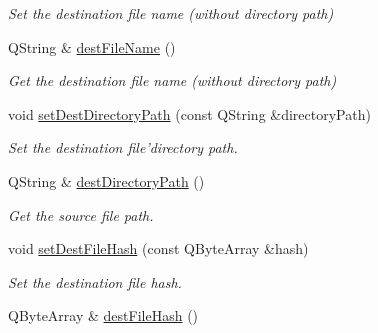 \begin{DoxyCompactItemize}
\begin{DoxyCompactList}\small\item\em Set the destination file name (without directory path) \end{DoxyCompactList}\item 
\hypertarget{classmdt_file_copier_item_af23cdc4c19fb8b80b7781c9dbe3bdc21}{
QString \& \hyperlink{classmdt_file_copier_item_af23cdc4c19fb8b80b7781c9dbe3bdc21}{destFileName} ()}
\label{classmdt_file_copier_item_af23cdc4c19fb8b80b7781c9dbe3bdc21}

\begin{DoxyCompactList}\small\item\em Get the destination file name (without directory path) \end{DoxyCompactList}\item 
\hypertarget{classmdt_file_copier_item_a64b6cb199454a76f1ceac9a658f62f83}{
void \hyperlink{classmdt_file_copier_item_a64b6cb199454a76f1ceac9a658f62f83}{setDestDirectoryPath} (const QString \&directoryPath)}
\label{classmdt_file_copier_item_a64b6cb199454a76f1ceac9a658f62f83}

\begin{DoxyCompactList}\small\item\em Set the destination file'directory path. \end{DoxyCompactList}\item 
\hypertarget{classmdt_file_copier_item_a6a459a2ed4318b3862cb55d0b62a3ecf}{
QString \& \hyperlink{classmdt_file_copier_item_a6a459a2ed4318b3862cb55d0b62a3ecf}{destDirectoryPath} ()}
\label{classmdt_file_copier_item_a6a459a2ed4318b3862cb55d0b62a3ecf}

\begin{DoxyCompactList}\small\item\em Get the source file path. \end{DoxyCompactList}\item 
\hypertarget{classmdt_file_copier_item_abeb35b72a31306c1fa2bf49a9cc2baea}{
void \hyperlink{classmdt_file_copier_item_abeb35b72a31306c1fa2bf49a9cc2baea}{setDestFileHash} (const QByteArray \&hash)}
\label{classmdt_file_copier_item_abeb35b72a31306c1fa2bf49a9cc2baea}

\begin{DoxyCompactList}\small\item\em Set the destination file hash. \end{DoxyCompactList}\item 
\hypertarget{classmdt_file_copier_item_a6e3a39ed3015e94ed3504cde79fe6a61}{
QByteArray \& \hyperlink{classmdt_file_copier_item_a6e3a39ed3015e94ed3504cde79fe6a61}{destFileHash} ()}
\label{classmdt_file_copier_item_a6e3a39ed3015e94ed3504cde79fe6a61}


\end{DoxyCompactItemize}
